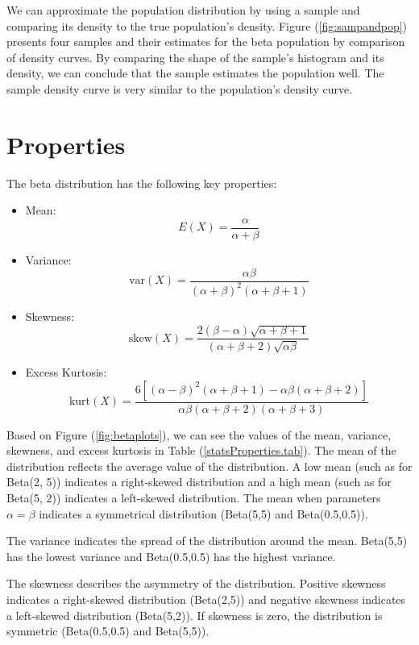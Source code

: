 \documentclass{article}\usepackage[]{graphicx}\usepackage[]{xcolor}
\begin{document}
\begin{multicols}{2}
We can approximate the population distribution by using a sample and comparing its density to the true population's density. Figure (\ref{fig:sampandpop}) presents four samples and their estimates for the beta population by comparison of density curves. By comparing the shape of the sample's histogram and its density, we can conclude that the sample estimates the population well. The sample density curve is very similar to the population's density curve.


\section{Properties}\label{sec:prop}

The beta distribution has the following key properties:
\begin{itemize}
    \item Mean: 
    $$E(X) = \frac{\alpha}{\alpha + \beta}$$

    \item Variance:
    $$\text{var}(X) = \frac{\alpha \beta}{(\alpha + \beta)^2 (\alpha + \beta + 1)}$$

    \item Skewness:
    $$\text{skew}(X) = \frac{2(\beta - \alpha)\sqrt{\alpha + \beta + 1}}{(\alpha + \beta + 2)\sqrt{\alpha \beta}}$$

    \item Excess Kurtosis:
    $$\text{kurt}(X) = \frac{6[(\alpha - \beta)^2(\alpha + \beta + 1) - \alpha \beta(\alpha + \beta + 2)]}{\alpha \beta (\alpha + \beta + 2)(\alpha + \beta + 3)}$$
\end{itemize}

Based on Figure (\ref{fig:betaplots}), we can see the values of the mean, variance, skewness, and excess kurtosis in Table (\ref{statsProperties.tab}). The mean of the distribution reflects the average value of the distribution. A low mean (such as for Beta(2, 5)) indicates a right-skewed distribution and a high mean (such as for Beta(5, 2)) indicates a left-skewed distribution. The mean when parameters $\alpha = \beta$ indicates a symmetrical distribution (Beta(5,5) and Beta(0.5,0.5)). 

The variance indicates the spread of the distribution around the mean. Beta(5,5) has the lowest variance and Beta(0.5,0.5) has the highest variance.

The skewness describes the asymmetry of the distribution. Positive skewness indicates a right-skewed distribution (Beta(2,5)) and negative skewness indicates a left-skewed distribution (Beta(5,2)). If skewness is zero, the distribution is symmetric (Beta(0.5,0.5) and Beta(5,5)).


\end{multicols}
\end{document}
